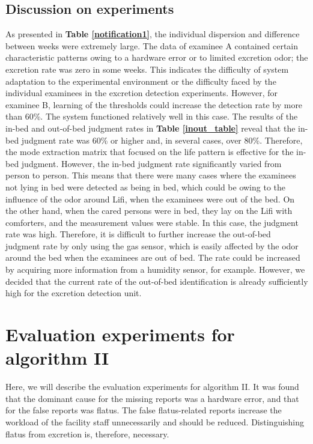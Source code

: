 \documentclass[publish,JRM,paper]{jaciiiarticle}
\begin{document}
\subsection{Discussion on experiments}
As presented in {\bf Table \ref{notification1}}, the individual dispersion and difference between weeks were extremely large. The data of examinee A contained certain characteristic patterns owing to a hardware error or to limited excretion odor; the excretion rate was zero in some weeks. This indicates the difficulty of system adaptation to the experimental environment or the difficulty faced by the individual examinees in the excretion detection experiments. However, for examinee B, learning of the thresholds could increase the detection rate by more than 60\%. The system functioned relatively well in this case.
The results of the in-bed and out-of-bed judgment rates in {\bf Table \ref{inout_table}} reveal that the in-bed judgment rate was 60\% or higher and, in several cases, over 80\%. Therefore, the mode extraction matrix that focused on the life pattern is effective for the in-bed judgment. However, the in-bed judgment rate significantly varied from person to person. This means that there were many cases where the examinees not lying in bed were detected as being in bed, which could be owing to the influence of the odor around Lifi, when the examinees were out of the bed. On the other hand, when the cared persons were in bed, they lay on the Lifi with comforters, and the measurement values were stable. In this case, the judgment rate was high.
Therefore, it is difficult to further increase the out-of-bed judgment rate by only using the gas sensor, which is easily affected by the odor around the bed when the examinees are out of bed. The rate could be increased by acquiring more information from a humidity sensor, for example. However, we decided that the current rate of the out-of-bed identification is already sufficiently high for the excretion detection unit.

\section{Evaluation experiments for algorithm I\hspace{-.1em}I}
Here, we will describe the evaluation experiments for algorithm I\hspace{-.1em}I. It was found that the dominant cause for the missing reports was a hardware error, and that for the false reports was flatus. The false flatus-related reports increase the workload of the facility staff unnecessarily and should be reduced. Distinguishing flatus from excretion is, therefore, necessary.
\end{document}
